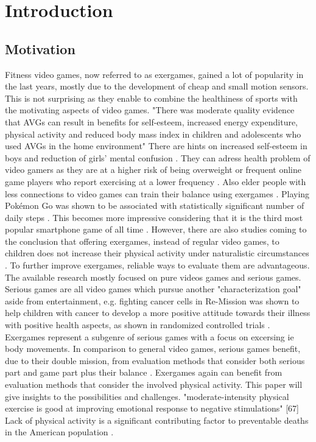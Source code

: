 \chapter{Introduction}

\section{Motivation}
Fitness video games, now referred to as exergames, gained a lot of popularity in the last years, mostly due to the development of cheap and small motion sensors. This is not surprising as they enable to combine the healthiness of sports with the motivating aspects of video games.
"There was moderate quality evidence that AVGs can result in benefits for self-esteem, increased energy expenditure, physical activity and reduced body mass index in children and adolescents who used AVGs in the home environment" \cite{santos2020active}
There are hints on increased self-esteem in boys and reduction of girls’ mental confusion \cite{andrade2020effect}.
They can adress health problem of video gamers as they are at a higher risk of being overweight \cite{melchior2014internet} or frequent online game players who report exercising at a lower frequency \cite{kowert2014unpopular}. Also elder people with less connections to video games can train their balance using exergames \cite{lai2013effects}. Playing Pokémon Go was shown to be associated with statistically significant number of daily steps \cite{khamzina2019impact}. This becomes more impressive considering that it is the third most popular smartphone game of all time \cite{link_pokemongo}. However, there are also studies coming to the conclusion that offering exergames, instead of regular video games, to children does not increase their physical activity under naturalistic circumstances \cite{baranowski2012impact}. 
To further improve exergames, reliable ways to evaluate them are advantageous. The available research mostly focused on pure videos games and serious games. Serious games are all video games which pursue another "characterization goal" aside from entertainment, e.g. fighting cancer cells in Re-Mission \cite{link_remission} was shown to help children with cancer to develop a more positive attitude towards their illness with positive health aspects, as shown in randomized controlled trials \cite{kato2008video}.
Exergames represent a subgenre of serious games with a focus on excersing ie body movements. In comparison to general video games, serious games benefit, due to their double mission, from evaluation methods that consider both serious part and game part plus their balance \cite{caserman2020quality}. Exergames again can benefit from evaluation methods that consider the involved physical activity. This paper will give insights to the possibilities and challenges.
"moderate-intensity physical exercise is good at improving emotional response to negative stimulations" [67]
Lack of physical activity is a significant contributing factor to preventable deaths in the American population \cite{bauer2014prevention}.

